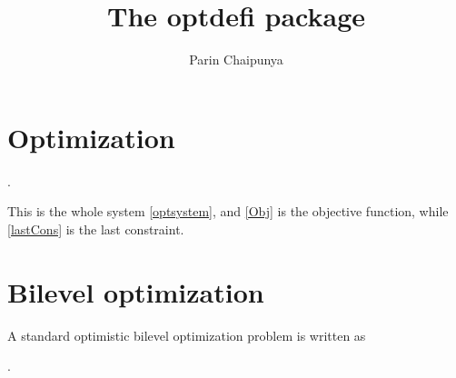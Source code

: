 \documentclass{article}
\title{The {\ttfamily optdefi} package}
\author{Parin Chaipunya}
\begin{document}
\maketitle

\section{Optimization}
\lipsum[1]
\begin{optim}
   \label{Obj}
  . \label{lastCons}
\end{optim}\label{optsystem}
This is the whole system \eqref{optsystem}, and \eqref{Obj} is the objective function, while \eqref{lastCons} is the last constraint.

\section{Bilevel optimization}

A standard optimistic bilevel optimization problem is written as
\begin{optim*}
  .
\end{optim*}
\end{document}
